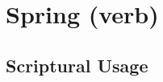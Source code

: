 \section{Spring (verb)}
	\label{SPRING}
	





\subsection{Scriptural Usage} %
	\label{SPRING-SCRIPTURES}

	
	
